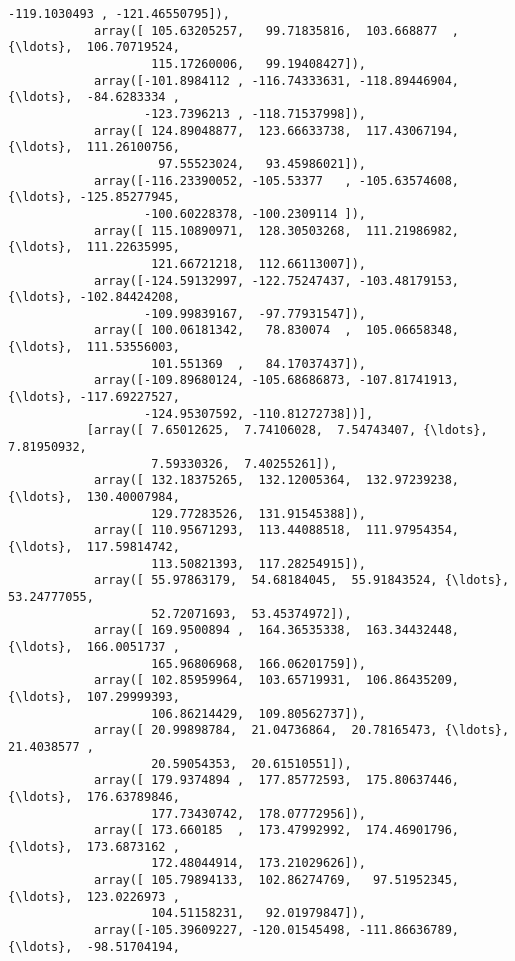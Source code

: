\documentclass[11pt]{article}
\begin{document}
\begin{Verbatim}[commandchars=\\\{\}]
                   -119.1030493 , -121.46550795]),
            array([ 105.63205257,   99.71835816,  103.668877  , {\ldots},  106.70719524,
                    115.17260006,   99.19408427]),
            array([-101.8984112 , -116.74333631, -118.89446904, {\ldots},  -84.6283334 ,
                   -123.7396213 , -118.71537998]),
            array([ 124.89048877,  123.66633738,  117.43067194, {\ldots},  111.26100756,
                     97.55523024,   93.45986021]),
            array([-116.23390052, -105.53377   , -105.63574608, {\ldots}, -125.85277945,
                   -100.60228378, -100.2309114 ]),
            array([ 115.10890971,  128.30503268,  111.21986982, {\ldots},  111.22635995,
                    121.66721218,  112.66113007]),
            array([-124.59132997, -122.75247437, -103.48179153, {\ldots}, -102.84424208,
                   -109.99839167,  -97.77931547]),
            array([ 100.06181342,   78.830074  ,  105.06658348, {\ldots},  111.53556003,
                    101.551369  ,   84.17037437]),
            array([-109.89680124, -105.68686873, -107.81741913, {\ldots}, -117.69227527,
                   -124.95307592, -110.81272738])],
           [array([ 7.65012625,  7.74106028,  7.54743407, {\ldots},  7.81950932,
                    7.59330326,  7.40255261]),
            array([ 132.18375265,  132.12005364,  132.97239238, {\ldots},  130.40007984,
                    129.77283526,  131.91545388]),
            array([ 110.95671293,  113.44088518,  111.97954354, {\ldots},  117.59814742,
                    113.50821393,  117.28254915]),
            array([ 55.97863179,  54.68184045,  55.91843524, {\ldots},  53.24777055,
                    52.72071693,  53.45374972]),
            array([ 169.9500894 ,  164.36535338,  163.34432448, {\ldots},  166.0051737 ,
                    165.96806968,  166.06201759]),
            array([ 102.85959964,  103.65719931,  106.86435209, {\ldots},  107.29999393,
                    106.86214429,  109.80562737]),
            array([ 20.99898784,  21.04736864,  20.78165473, {\ldots},  21.4038577 ,
                    20.59054353,  20.61510551]),
            array([ 179.9374894 ,  177.85772593,  175.80637446, {\ldots},  176.63789846,
                    177.73430742,  178.07772956]),
            array([ 173.660185  ,  173.47992992,  174.46901796, {\ldots},  173.6873162 ,
                    172.48044914,  173.21029626]),
            array([ 105.79894133,  102.86274769,   97.51952345, {\ldots},  123.0226973 ,
                    104.51158231,   92.01979847]),
            array([-105.39609227, -120.01545498, -111.86636789, {\ldots},  -98.51704194,

\end{Verbatim}
\end{document}
